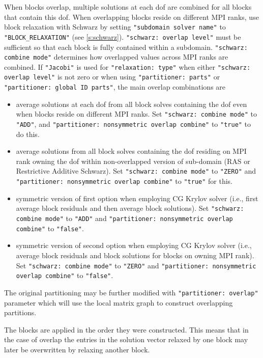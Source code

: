 \begin{itemize}
    When blocks overlap, multiple solutions at each dof are combined for all blocks
    that contain this dof. When overlapping blocks reside on 
    different MPI ranks,  use block relaxation with 
    Schwarz  by setting {\tt "subdomain solver name"} to {\tt "BLOCK\_RELAXATION"} (see \ref{s:schwarz}).
    {\tt "schwarz: overlap level"} must be sufficient so that each block is
    fully contained within a subdomain. {\tt "schwarz: combine mode"}
    determines how overlapped values across MPI ranks are combined. If 
    {\tt "Jacobi"} is used for {\tt "relaxation: type"} when either 
    {\tt "schwarz: overlap level"} is not zero or when using
    {\tt "partitioner: parts"} or {\tt "partitioner: global ID parts"}, the main overlap combinations are
\begin{itemize}
        \item average solutions at each dof from all block solves containing the dof even when blocks
           reside on different MPI ranks. Set {\tt "schwarz: combine mode"} to {\tt "ADD"},
           and  {\tt "partitioner: nonsymmetric overlap combine"} to {\tt "true"} to do this.
        \item average solutions from all block solves containing the dof residing on MPI rank owning the dof within non-overlapped
           version of sub-domain (RAS or Restrictive Additive Schwarz). Set {\tt "schwarz: combine mode"} to {\tt "ZERO"}
           and {\tt "partitioner: nonsymmetric overlap combine"} to {\tt "true"} for this.
        \item symmetric version of first option when employing CG Krylov solver (i.e., first average block residuals and then average block solutions). 
           Set {\tt "schwarz: combine mode"} to {\tt "ADD"} and  {\tt "partitioner: nonsymmetric overlap combine"} to {\tt "false"}.
        \item symmetric version of second option when employing CG Krylov solver (i.e., average block residuals and block solutions
           for blocks on owning MPI rank). 
           Set {\tt "schwarz: combine mode"} to {\tt "ZERO"} and  {\tt "partitioner: nonsymmetric overlap combine"} to {\tt "false"}.
\end{itemize}

\end{itemize}
The original partitioning may be further modified with {\tt "partitioner: overlap"}
parameter which will use the local matrix graph to construct overlapping
partitions.

The blocks are applied in the order they were constructed. This means that in
the case of overlap the entries in the solution vector relaxed by one block may
later be overwritten by relaxing another block.

